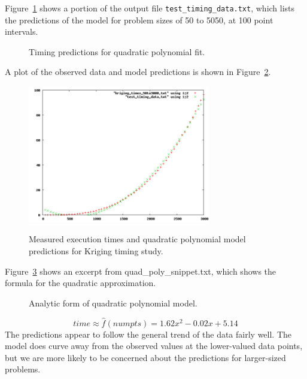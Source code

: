 \documentclass{article}
\begin{document}
Figure~\ref{fig:test_data_extract} shows a portion of the output file \texttt{test\_timing\_data.txt}, which
lists the predictions of the model for problem sizes of 50 to 5050, at 100 point
intervals.
\begin{figure}[htbp]
  \centering
  \begin{bigbox}
	\begin{small}
 	\end{small}
  \end{bigbox}
  \label{fig:test_data_extract}
  \caption{Timing predictions for quadratic polynomial fit.}
\end{figure}
A plot of the observed data and model predictions is shown in Figure~\ref{fig:timing_poly2}.

\begin{figure}[htbp]
  \centering 
  \includegraphics[width=8cm]{TimingMatrixOp/timing_poly2.png}
  \label{fig:timing_poly2}
  \caption{ Measured execution times and quadratic polynomial model predictions for Kriging timing study.}
\end{figure}

Figure~\ref{fig:timing_poly2_extract} shows an excerpt from quad\_poly\_snippet.txt, which shows the
formula for the quadratic approximation.
\begin{figure}[htbp]
  \centering
  \begin{bigbox}
	\begin{small}
	
 	\end{small}
  \end{bigbox}
   \label{fig:timing_poly2_extract}
   \caption{ Analytic form of quadratic polynomial model. }
\end{figure}
\[ time \approx \hat{f}(numpts) = 1.62x^2 - 0.02x + 5.14 \]
The predictions appear to follow the general trend of the data fairly well.  The
model does curve away from the observed values at the lower-valued data points,
but we are more likely to be concerned about the predictions for larger-sized
problems.
\end{document}
